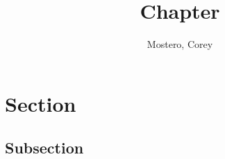 \documentclass[titlepage]{article}
\title{Chapter}
\author{Mostero, Corey}
\begin{document}
\maketitle

\tableofcontents
\section{Section}
\subsection{Subsection}
\end{document}
